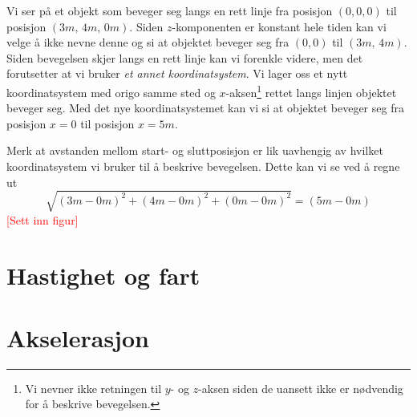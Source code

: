 \begin{texample}
Vi ser på et objekt som beveger seg langs en rett linje fra posisjon $(0,0,0)$ til posisjon $(3\unit{m},\, 4\unit{m},\, 0\unit{m})$. Siden $z$-komponenten er konstant hele tiden kan vi velge å ikke nevne denne og si at objektet beveger seg fra $(0,0)$ til $(3\unit{m},\,4\unit{m})$. Siden bevegelsen skjer langs en rett linje kan vi forenkle videre, men det forutsetter at vi bruker \emph{et annet koordinatsystem}. Vi lager oss et nytt koordinatsystem med origo samme sted og $x$-aksen\footnote{Vi nevner ikke retningen til $y$- og $z$-aksen siden de uansett ikke er nødvendig for å beskrive bevegelsen.} rettet langs linjen objektet beveger seg. Med det nye koordinatsystemet kan vi si at objektet beveger seg fra posisjon $x=0$ til posisjon $x=5\unit{m}$. 

Merk at avstanden mellom start- og sluttposisjon er lik uavhengig av hvilket koordinatsystem vi bruker til å beskrive bevegelsen. Dette kan vi se ved å regne ut 
\begin{displaymath}
	\sqrt{(3\unit{m}-0\unit{m})^2 + (4\unit{m}-0\unit{m})^2 + (0\unit{m}-0\unit{m})^2} = (5\unit{m}-0\unit{m})
\end{displaymath}
\textcolor{red}{[Sett inn figur]}
\end{texample}
\section{Hastighet og fart}

\section{Akselerasjon}